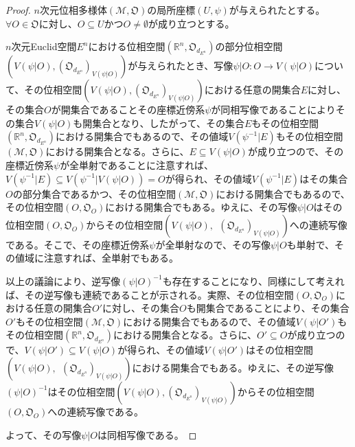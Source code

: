 \documentclass[dvipdfmx]{jsarticle}
\begin{document}
\begin{proof}
$n$次元位相多様体$\left( \mathcal{M},\mathfrak{O} \right)$の局所座標$(U,\psi)$が与えられたとする。$\forall O \in \mathfrak{O}$に対し、$O \subseteq U$かつ$O \neq \emptyset$が成り立つとする。\par
$n$次元Euclid空間$E^{n}$における位相空間$\left( \mathbb{R}^{n},\mathfrak{O}_{d_{E^{n}}} \right)$の部分位相空間$\left( V\left( \psi|O \right), \left( \mathfrak{O}_{d_{E^{n}}} \right)_{V\left( \psi|O \right)} \right)$が与えられたとき、写像$\psi|O:O \rightarrow V\left( \psi|O \right)$について、その位相空間$\left( V\left( \psi|O \right), \left( \mathfrak{O}_{d_{E^{n}}} \right)_{V\left( \psi|O \right)} \right)$における任意の開集合$E$に対し、その集合$O$が開集合であることその座標近傍系$\psi$が同相写像であることによりその集合$V\left( \psi|O \right)$も開集合となり、したがって、その集合$E$もその位相空間$\left( \mathbb{R}^{n},\mathfrak{O}_{d_{E^{n}}} \right)$における開集合でもあるので、その値域$V\left( \psi^{- 1}|E \right)$もその位相空間$\left( \mathcal{M},\mathfrak{O} \right)$における開集合となる。さらに、$E \subseteq V\left( \psi|O \right)$が成り立つので、その座標近傍系$\psi$が全単射であることに注意すれば、$V\left( \psi^{- 1}|E \right) \subseteq V\left( \psi^{- 1}|V\left( \psi|O \right) \right) = O$が得られ、その値域$V\left( \psi^{- 1}|E \right)$はその集合$O$の部分集合であるかつ、その位相空間$\left( \mathcal{M},\mathfrak{O} \right)$における開集合でもあるので、その位相空間$\left( O,\mathfrak{O}_{O} \right)$における開集合でもある。ゆえに、その写像$\psi|O$はその位相空間$\left( O,\mathfrak{O}_{O} \right)$からその位相空間$\left( V\left( \psi|O \right),\ \ \left( \mathfrak{O}_{d_{E^{n}}} \right)_{V\left( \psi|O \right)} \right)$への連続写像である。そこで、その座標近傍系$\psi$が全単射なので、その写像$\psi|O$も単射で、その値域に注意すれば、全単射でもある。\par
以上の議論により、逆写像$\left( \psi|O \right)^{- 1}$も存在することになり、同様にして考えれば、その逆写像も連続であることが示される。実際、その位相空間$\left( O,\mathfrak{O}_{O} \right)$における任意の開集合$O'$に対し、その集合$O$も開集合であることにより、その集合$O'$もその位相空間$\left( \mathcal{M},\mathfrak{O} \right)$における開集合でもあるので、その値域$V\left( \psi|O' \right)$もその位相空間$\left( \mathbb{R}^{n},\mathfrak{O}_{d_{E^{n}}} \right)$における開集合となる。さらに、$O' \subseteq O$が成り立つので、$V\left( \psi|O' \right) \subseteq V\left( \psi|O \right)$が得られ、その値域$V\left( \psi|O' \right)$はその位相空間$\left( V\left( \psi|O \right),\ \ \left( \mathfrak{O}_{d_{E^{n}}} \right)_{V\left( \psi|O \right)} \right)$における開集合でもある。ゆえに、その逆写像$\left( \psi|O \right)^{- 1}$はその位相空間$\left( V\left( \psi|O \right), \left( \mathfrak{O}_{d_{E^{n}}} \right)_{V\left( \psi|O \right)} \right)$からその位相空間$\left( O,\mathfrak{O}_{O} \right)$への連続写像である。\par
よって、その写像$\psi|O$は同相写像である。
\end{proof}
\end{document}
